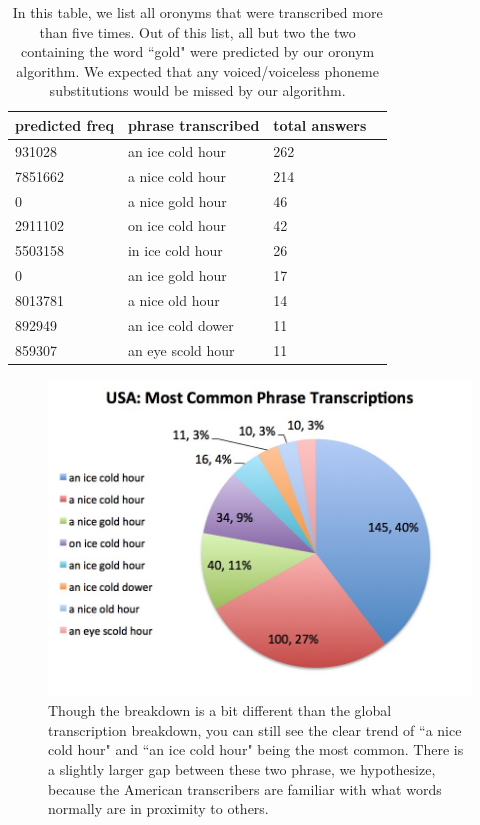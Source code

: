 \begin{table}
\begin{center}
\begin{tabular}{ | l | l | l | c | }
\hline 
predicted freq & phrase transcribed & total answers \\
\hline 
931028 &  an ice cold hour &  262 \\
\hline
7851662&   a nice cold hour &  214  \\
\hline
0  & a nice gold hour &  46 \\
\hline
2911102 &  on ice cold hour &  42 \\
\hline
5503158&   in ice cold hour &  26 \\
\hline
0 &  an ice gold hour &  17 \\
\hline
8013781 &  a nice old hour&   14 \\
\hline
892949&   an ice cold dower &  11 \\
\hline
859307 &  an eye scold hour &  11 \\
\hline
\hline 
\end{tabular}
\captionfonts
\caption[Phrase word frequency sum vs times transcribed]{ In this table, we list all oronyms that were transcribed more than five times. Out of this list, all but two the two containing the word ``gold" were predicted by our oronym algorithm.  We expected that any voiced/voiceless phoneme substitutions would be missed by our algorithm. }
\label{table:fullFreqVsActual}
\end{center}
\end{table}


\begin{figure}
\includegraphics[width=150mm]{mostCommonTranscriptionsPieChartUSA.jpg}
\captionfonts
\caption[Most Common Transcriptions from American respondents]{ Though the breakdown is a bit different than the global transcription breakdown, you can still see the clear trend of ``a nice cold hour" and ``an ice cold hour" being the most common.  There is a slightly larger gap between these two phrase, we hypothesize, because the American transcribers are familiar with what words normally are in proximity to others. }
\label{fig:mostCommonTranscriptionsPieChartUSA}
\end{figure}



